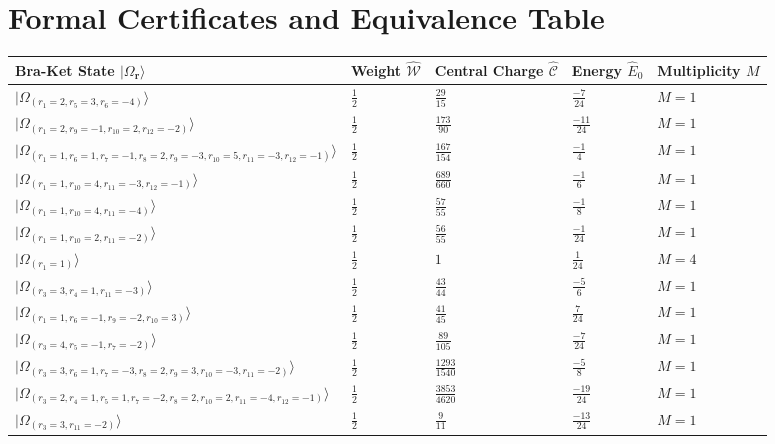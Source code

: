 \documentclass[11pt,twoside,openright]{book}
\begin{document}
\chapter{Formal Certificates and Equivalence Table}
\begin{longtable}{p{4cm}llll}
\toprule
\textbf{Bra-Ket State $|\Omega_{\mathbf{r}}\rangle$} & \textbf{Weight $\hat{\mathcal{W}}$} & \textbf{Central Charge $\hat{\mathcal{C}}$} & \textbf{Energy $\hat{E}_0$} & \textbf{Multiplicity $M$} \\
\midrule
\endhead
$|Ω_(r_1=2, r_5=3, r_6=-4)⟩$ & $\frac{1}{2}$ & $\frac{29}{15}$ & $\frac{-7}{24}$ & $M=1$ \\
$|\Omega_{(r_{1}=2, r_{9}=-1, r_{10}=2, r_{12}=-2)}\rangle$ & $\frac{1}{2}$ & $\frac{173}{90}$ & $\frac{-11}{24}$ & $M=1$ \\
$|\Omega_{(r_{1}=1, r_{6}=1, r_{7}=-1, r_{8}=2, r_{9}=-3, r_{10}=5, r_{11}=-3, r_{12}=-1)}\rangle$ & $\frac{1}{2}$ & $\frac{167}{154}$ & $\frac{-1}{4}$ & $M=1$ \\
$|\Omega_{(r_{1}=1, r_{10}=4, r_{11}=-3, r_{12}=-1)}\rangle$ & $\frac{1}{2}$ & $\frac{689}{660}$ & $\frac{-1}{6}$ & $M=1$ \\
$|\Omega_{(r_{1}=1, r_{10}=4, r_{11}=-4)}\rangle$ & $\frac{1}{2}$ & $\frac{57}{55}$ & $\frac{-1}{8}$ & $M=1$ \\
$|\Omega_{(r_{1}=1, r_{10}=2, r_{11}=-2)}\rangle$ & $\frac{1}{2}$ & $\frac{56}{55}$ & $\frac{-1}{24}$ & $M=1$ \\
$|\Omega_{(r_{1}=1)}\rangle$ & $\frac{1}{2}$ & $1$ & $\frac{1}{24}$ & $M=4$ \\
$|\Omega_{(r_{3}=3, r_{4}=1, r_{11}=-3)}\rangle$ & $\frac{1}{2}$ & $\frac{43}{44}$ & $\frac{-5}{6}$ & $M=1$ \\
$|\Omega_{(r_{1}=1, r_{6}=-1, r_{9}=-2, r_{10}=3)}\rangle$ & $\frac{1}{2}$ & $\frac{41}{45}$ & $\frac{7}{24}$ & $M=1$ \\
$|\Omega_{(r_{3}=4, r_{5}=-1, r_{7}=-2)}\rangle$ & $\frac{1}{2}$ & $\frac{89}{105}$ & $\frac{-7}{24}$ & $M=1$ \\
$|\Omega_{(r_{3}=3, r_{6}=1, r_{7}=-3, r_{8}=2, r_{9}=3, r_{10}=-3, r_{11}=-2)}\rangle$ & $\frac{1}{2}$ & $\frac{1293}{1540}$ & $\frac{-5}{8}$ & $M=1$ \\
$|\Omega_{(r_{3}=2, r_{4}=1, r_{5}=1, r_{7}=-2, r_{8}=2, r_{10}=2, r_{11}=-4, r_{12}=-1)}\rangle$ & $\frac{1}{2}$ & $\frac{3853}{4620}$ & $\frac{-19}{24}$ & $M=1$ \\
$|\Omega_{(r_{3}=3, r_{11}=-2)}\rangle$ & $\frac{1}{2}$ & $\frac{9}{11}$ & $\frac{-13}{24}$ & $M=1$ \\

\end{longtable}
\end{document}
